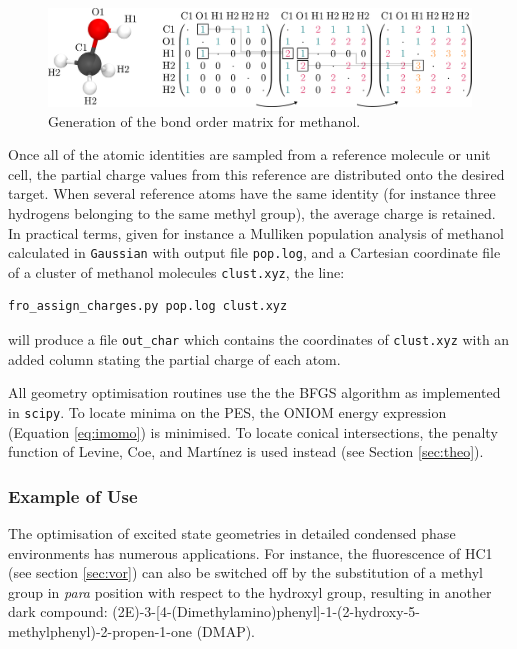 \begin{figure}[ht]
\centering
  \includegraphics[width=\textwidth]{Chapters/6Implementation/matrices.pdf}
  \caption{Generation of the bond order matrix for methanol.}
  \label{fig:connectivity}
\end{figure}

Once all of the atomic identities are sampled from a reference molecule or unit cell, the partial charge values from this reference are distributed onto the desired target. When several reference atoms have the same identity (for instance three hydrogens belonging to the same methyl group), the average charge is retained. In practical terms, given for instance a Mulliken population analysis of methanol calculated in \texttt{Gaussian} with output file \texttt{pop.log}, and a Cartesian coordinate file of a cluster of methanol molecules \texttt{clust.xyz}, the line:

\begin{verbatim}
fro_assign_charges.py pop.log clust.xyz
\end{verbatim}
will produce a file \texttt{out\_char} which contains the coordinates of \texttt{clust.xyz} with an added column stating the partial charge of each atom.

All geometry optimisation routines use the the BFGS algorithm as implemented in \texttt{scipy}.\cite{scipy} To locate minima on the PES, the ONIOM energy expression (Equation \ref{eq:imomo}) is minimised. To locate conical intersections, the penalty function of Levine, Coe, and Mart\'inez is used instead (see Section \ref{sec:theo}).\cite{Levine2008}

\subsubsection{Example of Use}

The optimisation of excited state geometries in detailed condensed phase environments has numerous applications. For instance, the fluorescence of HC1 (see section \ref{sec:vor}) can also be switched off by the substitution of a methyl group in \textit{para} position with respect to the hydroxyl group, resulting in another dark compound: (2E)-3-[4-(Dimethylamino)phenyl]-1-(2-hydroxy-5-methylphenyl)-2-propen-1-one (DMAP).\cite{Zhang2015,Zahid2017}

